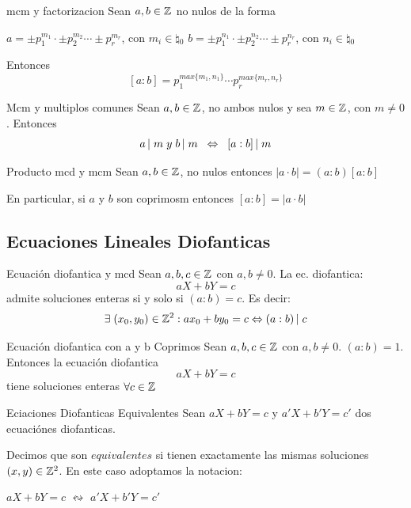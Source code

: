 \documentclass[10pt]{article}
\begin{document}
\begin{propo}{mcm y factorizacion}
 Sean $a,b \in \entero{}$ no nulos de la forma
\begin{center}
 $a = \pm p_1^{m_1} \cdot \pm p_2^{m_2} \cdots \pm p_r^{m_r}$, con $m_i \in \natural{}_0$
 $b = \pm p_1^{n_1} \cdot \pm p_2^{n_2} \cdots \pm p_r^{n_r}$, con $n_i \in \natural{}_0$
 \end{center}
 Entonces
 \[[a:b] = p_1^{max\{m_1,n_1\}} \cdots p_r^{max\{m_r,n_r\} }\]
 \end{propo}

\begin{cor}{Mcm y multiplos comunes}
 Sean $a, b \in \entero{}$, no ambos nulos y sea $m \in \entero{}$, con $m \neq 0$. Entonces
 \[\divi{a}{m} \es{0.1} y \es{0.1} \divi{b}{m} \es{0.2} \sii \es{0.2}\divi{[a:b]}{m}\]
\end{cor}

\begin{propo}{Producto mcd y mcm}
Sean $a, b \in \entero{}$, no nulos entonces $|a \cdot b| = (a:b)[a:b]$

En particular, si $a$ y $b$ son coprimosm entonces $[a:b] = |a \cdot b|$
\end{propo}

\begin{center}
\subsection{Ecuaciones Lineales Diofanticas} 
\end{center}

\begin{propo}{Ecuación diofantica y mcd}
Sean $a,b,c \in \entero{}$ con $a,b \neq 0$. La ec. diofantica:
\[aX + bY =c\]
admite soluciones enteras si y solo si $(a:b) = c$. Es decir:
\[\exists \es{0.1} (x_0, y_0) \in \entero{2} : a x_0 + b y_0 = c \sii \divi{(a:b)}{c}\]
\end{propo}

\begin{cor}{Ecuación diofantica con a y b Coprimos}
 Sean $a,b,c \in \entero{}$ con $a,b \neq 0$. $(a:b)=1$. Entonces la ecuación diofantica
\[aX + bY =c\]
tiene soluciones enteras $\forall c \in \entero{}$
 \end{cor}

 \begin{defi}{Eciaciones Diofanticas Equivalentes}
  Sean $aX + bY =c$ y $a'X + b'Y =c'$ dos ecuaciónes diofanticas. 
  
  Decimos que son $equivalentes$ si tienen exactamente las mismas soluciones $(x,y) \in \entero{2}$. En este caso adoptamos la notacion:
  \begin{center}
   $aX + bY =c$ $\leftrightsquigarrow$ $a'X + b'Y =c'$
  \end{center}
 \end{defi}
\end{document}
